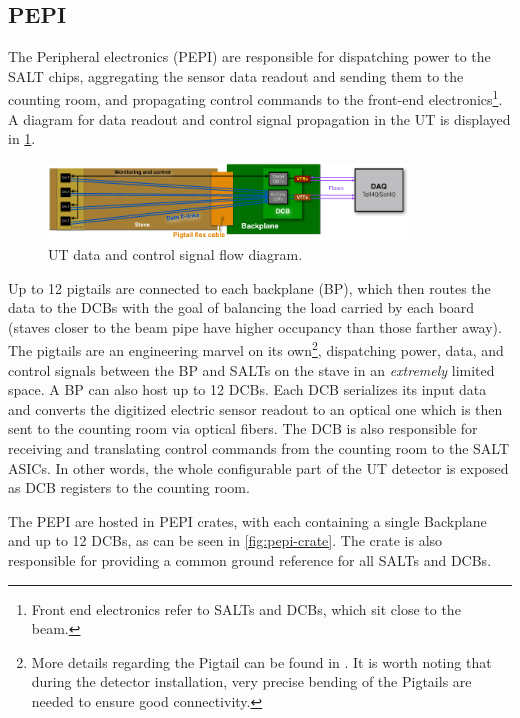 \subsection{PEPI}
\label{ref:ut:overview:pepi}

The Peripheral electronics (PEPI) are responsible for dispatching power to
the SALT chips,
aggregating the sensor data readout and sending them to the counting room,
and propagating control commands to the front-end electronics\footnote{
    Front end electronics refer to SALTs and DCBs, which sit close to the beam.
}.
A diagram for data readout and control signal propagation in the UT is displayed
in
\cref{fig:ut-readout-diagram}.

\begin{figure}[!htb]
    \centering
    \includegraphics[width=0.85\textwidth]{./figs-ut-upgrade/detector/ut_data_control_flow.pdf}
    \caption{
        UT data and control signal flow diagram.
    }
    \label{fig:ut-readout-diagram}
\end{figure}

Up to 12 pigtails are connected to each backplane (BP),
which then routes the data to the DCBs with the goal of balancing the load
carried by each board (staves closer to the beam pipe have higher occupancy than
those farther away).
The pigtails are an engineering marvel on its own\footnote{
    More details regarding the Pigtail can be found in
    \cite{Andrews:2018vla}.
    It is worth noting that during the detector installation,
    very precise bending of the Pigtails are needed to ensure good connectivity.
},
dispatching power, data, and control signals between the BP and SALTs on
the stave in an \emph{extremely} limited space.
A BP can also host up to 12 DCBs.
Each DCB serializes its input data and converts the digitized electric sensor
readout to an optical one which is then sent to the counting room via optical
fibers.
The DCB is also responsible for receiving and translating control commands from
the counting room to the SALT ASICs.
In other words, the whole configurable part of the UT detector is exposed as DCB
registers to the counting room.

The PEPI are hosted in PEPI crates, with each containing a single Backplane and
up to 12 DCBs,
as can be seen in \cref{fig:pepi-crate}.
The crate is also responsible for providing a common ground reference for all
SALTs and DCBs.

